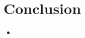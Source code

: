 \section{Conclusion}
\begin{itemize}
	\item 
	
	
	
\end{itemize}


\newpage


	\footnotesize{
		
		
	}





